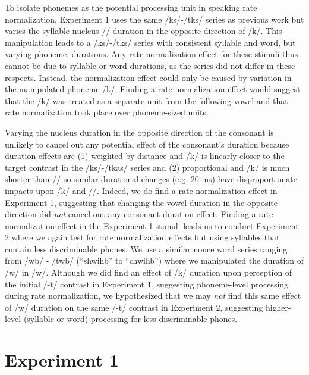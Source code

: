 To isolate phonemes as the potential processing unit in speaking rate normalization, Experiment 1 uses the same /\textesh k\textscripta s/-/t\textesh k\textscripta s/ series as previous work but varies the syllable nucleus /\textscripta/ duration in the opposite direction of /k/. This manipulation leads to a /\textesh k\textscripta s/-/t\textesh k\textscripta s/ series with consistent syllable and word, but varying phoneme, durations. Any rate normalization effect for these stimuli thus cannot be due to syllable or word durations, as the series did not differ in these respects. Instead, the normalization effect could only be caused by variation in the manipulated phoneme /k/. Finding a rate normalization effect would suggest that the /k/ was treated as a separate unit from the following vowel and that rate normalization took place over phoneme-sized units. 

Varying the nucleus duration in the opposite direction of the consonant is unlikely to cancel out any potential effect of the consonant's duration because duration effects are (1) weighted by distance and /k/ is linearly closer to the target contrast in the /\textesh k\textscripta s/-/t\textesh k\textscript as/ series and (2) proportional and /k/ is much shorter than /\textscripta/ so similar durational changes (e.g. 20 ms) have disproportionate impacts upon /k/ and /\textscripta/. Indeed, we do find a rate normalization effect in Experiment 1, suggesting that changing the vowel duration in the opposite direction did \textit{not} cancel out any consonant duration effect. Finding a rate normalization effect in the Experiment 1 stimuli leads us to conduct Experiment 2 where we again test for rate normalization effects but using syllables that contain less discriminable phones. We use a similar nonce word series ranging from /\textesh w\textsci b/ - /t\textesh w\textsci b/ (``shwihb'' to ``chwihb'') where we manipulated the duration of /w/ in /w\textsci/. Although we did find an effect of /k/ duration upon perception of the initial /\textesh-t\textesh/ contrast in Experiment 1, suggesting phoneme-level processing during rate normalization, we hypothesized that we may \textit{not} find this same effect of /w/ duration on the same /\textesh-t\textesh/ contrast in Experiment 2, suggesting higher-level (syllable or word) processing for less-discriminable phones. 




\section{Experiment 1}\label{exp1}

